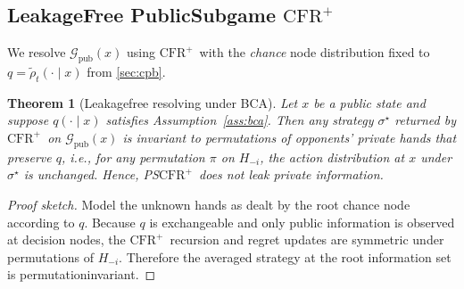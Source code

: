 \documentclass[10pt]{article}
\newcommand{\CFRplus}{\ensuremath{\mathrm{CFR}^{+}}\xspace}
\newcommand{\1}{\mathbf{1}}
\theoremstyle{plain}
\newtheorem{theorem}{Theorem}
\begin{document}
\subsection{Leakage\textendash Free Public\textendash Subgame \CFRplus}
\label{sec:lfps}
We re\textendash solve $\mathcal{G}_{\text{pub}}(x)$ using \CFRplus\ with the \emph{chance} node distribution fixed to $q=\tilde{\rho}_t(\cdot\mid x)$ from \cref{sec:cpb}.
\begin{theorem}[Leakage\textendash free re\textendash solving under BCA]
\label{thm:noleak}
Let $x$ be a public state and suppose $q(\cdot\mid x)$ satisfies Assumption~\ref{ass:bca}. Then any strategy $\sigma^\star$ returned by \CFRplus\ on $\mathcal{G}_{\text{pub}}(x)$ is \emph{invariant} to permutations of opponents' private hands that preserve $q$, i.e., for any permutation $\pi$ on $H_{-i}$, the action distribution at $x$ under $\sigma^\star$ is unchanged. Hence, PS\textendash \CFRplus\ does not leak private information.
\end{theorem}
\begin{proof}[Proof sketch]
Model the unknown hands as dealt by the root chance node according to $q$. Because $q$ is exchangeable and only public information is observed at decision nodes, the \CFRplus\ recursion and regret updates are symmetric under permutations of $H_{-i}$. Therefore the averaged strategy at the root information set is permutation\textendash invariant.
\end{proof}
\end{document}

